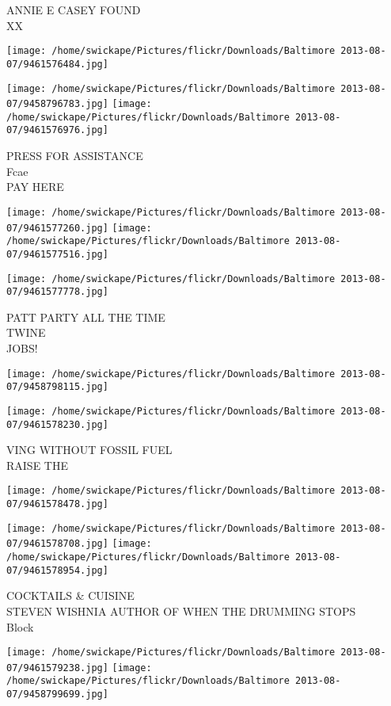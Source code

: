 \documentclass[10pt,letterpaper]{article}
\begin{document}
ANNIE E CASEY FOUND\\
XX
\pagebreak

\texttt{[image: /home/swickape/Pictures/flickr/Downloads/Baltimore 2013-08-07/9461576484.jpg]}

\vspace{0.25in}
\texttt{[image: /home/swickape/Pictures/flickr/Downloads/Baltimore 2013-08-07/9458796783.jpg]}
\texttt{[image: /home/swickape/Pictures/flickr/Downloads/Baltimore 2013-08-07/9461576976.jpg]}

PRESS FOR ASSISTANCE\\
Fcae\\
PAY HERE
\pagebreak

\texttt{[image: /home/swickape/Pictures/flickr/Downloads/Baltimore 2013-08-07/9461577260.jpg]}
\texttt{[image: /home/swickape/Pictures/flickr/Downloads/Baltimore 2013-08-07/9461577516.jpg]}

\texttt{[image: /home/swickape/Pictures/flickr/Downloads/Baltimore 2013-08-07/9461577778.jpg]}

PATT PARTY ALL THE TIME\\
TWINE\\
JOBS!
\pagebreak

\texttt{[image: /home/swickape/Pictures/flickr/Downloads/Baltimore 2013-08-07/9458798115.jpg]}

\vspace{0.25in}
\texttt{[image: /home/swickape/Pictures/flickr/Downloads/Baltimore 2013-08-07/9461578230.jpg]}

VING WITHOUT FOSSIL FUEL\\
RAISE THE
\pagebreak

\texttt{[image: /home/swickape/Pictures/flickr/Downloads/Baltimore 2013-08-07/9461578478.jpg]}

\vspace{0.25in}
\texttt{[image: /home/swickape/Pictures/flickr/Downloads/Baltimore 2013-08-07/9461578708.jpg]}
\texttt{[image: /home/swickape/Pictures/flickr/Downloads/Baltimore 2013-08-07/9461578954.jpg]}

COCKTAILS \& CUISINE\\
STEVEN WISHNIA AUTHOR OF WHEN THE DRUMMING STOPS\\
Block
\pagebreak

\texttt{[image: /home/swickape/Pictures/flickr/Downloads/Baltimore 2013-08-07/9461579238.jpg]}
\texttt{[image: /home/swickape/Pictures/flickr/Downloads/Baltimore 2013-08-07/9458799699.jpg]}
\end{document}
